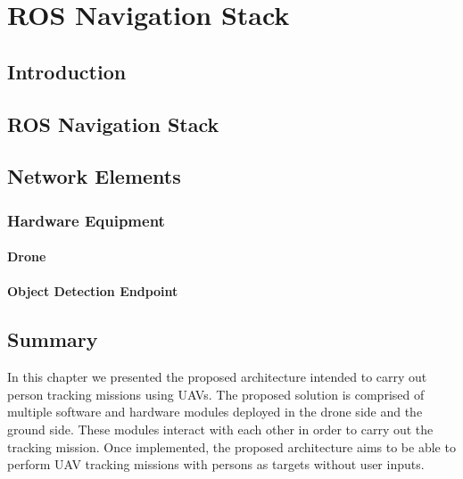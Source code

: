 \chapter{ROS Navigation Stack} \label{ch:BaseWork}

\section{Introduction}



\section{ROS Navigation Stack}\label{ch:requirements}

\section{Network Elements}\label{ch:net}

\subsection{Hardware Equipment}\label{ch:hardware}



\subsubsection{Drone}






\subsubsection{Object Detection Endpoint}\label{ch:cpu}




\section{Summary}


In this chapter we presented the proposed architecture intended to carry out person tracking missions using \ac{UAV}s.  
The proposed solution is comprised of multiple software and hardware modules deployed in the drone side and the ground side. These modules interact with each other in order to carry out the tracking mission.
Once implemented, the proposed architecture aims to be able to perform \ac{UAV} tracking missions with persons as targets without user inputs. 
